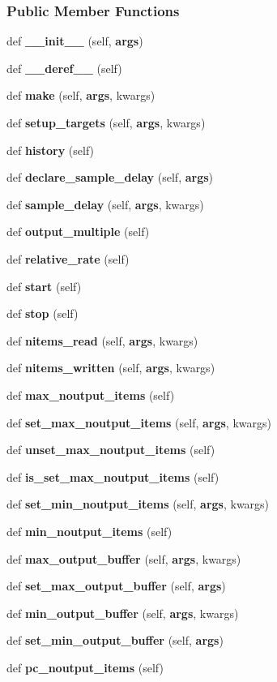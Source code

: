 \subsubsection*{Public Member Functions}
\begin{DoxyCompactItemize}
\item 
def {\bf \+\_\+\+\_\+init\+\_\+\+\_\+} (self, {\bf args})
\item 
def {\bf \+\_\+\+\_\+deref\+\_\+\+\_\+} (self)
\item 
def {\bf make} (self, {\bf args}, kwargs)
\item 
def {\bf setup\+\_\+targets} (self, {\bf args}, kwargs)
\item 
def {\bf history} (self)
\item 
def {\bf declare\+\_\+sample\+\_\+delay} (self, {\bf args})
\item 
def {\bf sample\+\_\+delay} (self, {\bf args}, kwargs)
\item 
def {\bf output\+\_\+multiple} (self)
\item 
def {\bf relative\+\_\+rate} (self)
\item 
def {\bf start} (self)
\item 
def {\bf stop} (self)
\item 
def {\bf nitems\+\_\+read} (self, {\bf args}, kwargs)
\item 
def {\bf nitems\+\_\+written} (self, {\bf args}, kwargs)
\item 
def {\bf max\+\_\+noutput\+\_\+items} (self)
\item 
def {\bf set\+\_\+max\+\_\+noutput\+\_\+items} (self, {\bf args}, kwargs)
\item 
def {\bf unset\+\_\+max\+\_\+noutput\+\_\+items} (self)
\item 
def {\bf is\+\_\+set\+\_\+max\+\_\+noutput\+\_\+items} (self)
\item 
def {\bf set\+\_\+min\+\_\+noutput\+\_\+items} (self, {\bf args}, kwargs)
\item 
def {\bf min\+\_\+noutput\+\_\+items} (self)
\item 
def {\bf max\+\_\+output\+\_\+buffer} (self, {\bf args}, kwargs)
\item 
def {\bf set\+\_\+max\+\_\+output\+\_\+buffer} (self, {\bf args})
\item 
def {\bf min\+\_\+output\+\_\+buffer} (self, {\bf args}, kwargs)
\item 
def {\bf set\+\_\+min\+\_\+output\+\_\+buffer} (self, {\bf args})
\item 
def {\bf pc\+\_\+noutput\+\_\+items} (self)

\end{DoxyCompactItemize}
